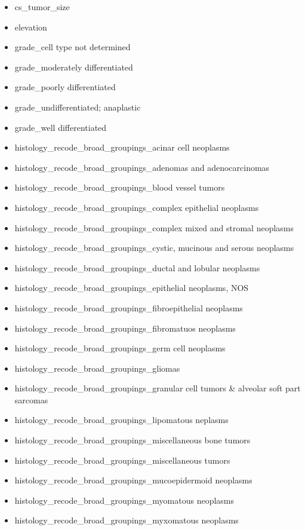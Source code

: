 \documentclass[10pt,letterpaper]{article}
\begin{document}
\begin{itemize}[noitemsep]
\item cs\_tumor\_size
\item elevation
\item grade\_cell type not determined
\item grade\_moderately differentiated
\item grade\_poorly differentiated
\item grade\_undifferentiated; anaplastic
\item grade\_well differentiated
\item histology\_recode\_broad\_groupings\_acinar cell neoplasms
\item histology\_recode\_broad\_groupings\_adenomas and adenocarcinomas
\item histology\_recode\_broad\_groupings\_blood vessel tumors
\item histology\_recode\_broad\_groupings\_complex epithelial neoplasms
\item histology\_recode\_broad\_groupings\_complex mixed and stromal neoplasms
\item histology\_recode\_broad\_groupings\_cystic, mucinous and serous neoplasms
\item histology\_recode\_broad\_groupings\_ductal and lobular neoplasms
\item histology\_recode\_broad\_groupings\_epithelial neoplasms, NOS
\item histology\_recode\_broad\_groupings\_fibroepithelial neoplasms
\item histology\_recode\_broad\_groupings\_fibromatuos neoplasms
\item histology\_recode\_broad\_groupings\_germ cell neoplasms
\item histology\_recode\_broad\_groupings\_gliomas
\item histology\_recode\_broad\_groupings\_granular cell tumors \& alveolar soft part sarcomas
\item histology\_recode\_broad\_groupings\_lipomatous neplasms
\item histology\_recode\_broad\_groupings\_miscellaneous bone tumors
\item histology\_recode\_broad\_groupings\_miscellaneous tumors
\item histology\_recode\_broad\_groupings\_mucoepidermoid neoplasms
\item histology\_recode\_broad\_groupings\_myomatous neoplasms
\item histology\_recode\_broad\_groupings\_myxomatous neoplasms

\end{itemize}
\end{document}
